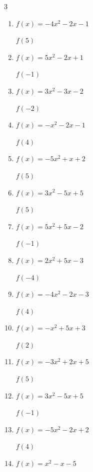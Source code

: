 \begin{multicols}{3}
\begin{enumerate}
$f(-2)$
        \phantom{$= -22$}

  \item $f(x)=-4x^{2}-2x-1$

$f(5)$
        \phantom{$= -111$}

  \item $f(x)=5x^{2}-2x+1$

$f(-1)$
        \phantom{$= 8$}

  \item $f(x)=3x^{2}-3x-2$

$f(-2)$
        \phantom{$= 16$}

  \item $f(x)=-x^{2}-2x-1$

$f(4)$
        \phantom{$= -25$}

  \item $f(x)=-5x^{2}+x+2$

$f(5)$
        \phantom{$= -118$}

  \item $f(x)=3x^{2}-5x+5$

$f(5)$
        \phantom{$= 55$}

  \item $f(x)=5x^{2}+5x-2$

$f(-1)$
        \phantom{$= -2$}

  \item $f(x)=2x^{2}+5x-3$

$f(-4)$
        \phantom{$= 9$}

  \item $f(x)=-4x^{2}-2x-3$

$f(4)$
        \phantom{$= -75$}

  \item $f(x)=-x^{2}+5x+3$

$f(2)$
        \phantom{$= 9$}

  \item $f(x)=-3x^{2}+2x+5$

$f(5)$
        \phantom{$= -60$}

\columnbreak %

  \item $f(x)=3x^{2}-5x+5$

$f(-1)$
        \phantom{$= 13$}

  \item $f(x)=-5x^{2}-2x+2$

$f(4)$
        \phantom{$= -86$}

  \item $f(x)=x^{2}-x-5$


\end{enumerate}
\end{multicols}
